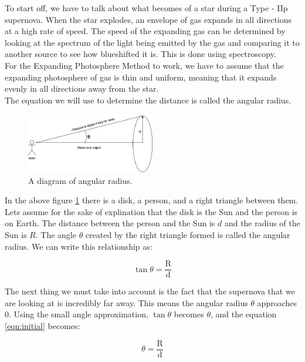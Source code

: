 To start off, we have to talk about what becomes of a star during a Type - IIp supernova.
When the star explodes, an envelope of gas expands in all directions at a high rate of speed.
The speed of the expanding gas can be determined by looking at the spectrum of the light being 
emitted by the gas and comparing it to another source to see how blueshifted it is. This is done 
using spectroscopy. 
\\
For the Expanding Photosphere Method to work, we have to assume that the expanding photosphere of gas 
is thin and uniform, meaning that it expands evenly in all directions away from the star.
\\
The equation we will use to determine the distance is called the angular radius.

\begin{figure} [h!]
    \begin{center}
    \includegraphics[width=0.5\textwidth]{Angular_Radius.png}
    \end{center}
    \label{fig:angular_radius}
    \caption{A diagram of angular radius.}    
\end{figure}

In the above figure \ref{fig:angular_radius} there is a disk, a person, and a right triangle between them.
Lets assume for the sake of explination that the disk is the Sun and the person is on Earth.
The distance between the person and the Sun is $d$ and the radius of the Sun is $R$.
The angle $\theta$ created by the right triangle formed is called the angular radius. 
We can write this relationship as:

\begin{equation}\label{eqn:initial}
    \tan{\theta} = \frac{\textrm{R}}{\textrm{d}}
\end{equation}

The next thing we must take into account is the fact that the supernova that we are looking at is incredibly far away.
This means the angular radius $\theta$ approaches 0. Using the small angle approximation, $\tan{\theta}$ becomes $\theta$, 
and the equation \ref{eqn:initial} becomes:

\begin{equation}\label{eqn:after_saa}
    \theta = \frac{\textrm{R}}{\textrm{d}}
\end{equation}

